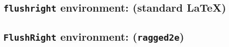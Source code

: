 \documentclass{article}
\begin{document}
	\setlength{\hsize}{0.9\hsize}%
	
	\subsection*{\texttt{flushright} environment: (standard \LaTeX{})}
	
	\begin{flushright}
		\blindtext[1]
	\end{flushright}
	
	\subsection*{\texttt{FlushRight} environment: (\texttt{ragged2e})}
	
	\begin{FlushRight}
		\blindtext[1]
	\end{FlushRight}
	
\end{document}
